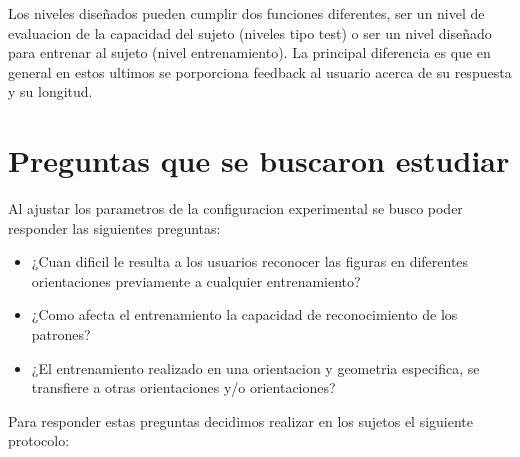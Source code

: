 \documentclass{article}
\begin{document}
Los niveles diseñados pueden cumplir dos funciones diferentes, ser un nivel de evaluacion de la capacidad del sujeto (niveles tipo test) o ser un nivel diseñado para entrenar al sujeto (nivel entrenamiento). La principal diferencia es que en general en estos ultimos se porporciona feedback al usuario acerca de su respuesta y su longitud.

\section{Preguntas que se buscaron estudiar}

Al ajustar los parametros de la configuracion experimental se busco poder responder las siguientes preguntas:

\begin{itemize}
    \item ¿Cuan dificil le resulta a los usuarios reconocer las figuras en diferentes orientaciones previamente a cualquier entrenamiento?
    \item ¿Como afecta el entrenamiento la capacidad de reconocimiento de los patrones?
    \item ¿El entrenamiento realizado en una orientacion y geometria especifica, se transfiere a otras orientaciones y/o orientaciones?
\end{itemize}

Para responder estas preguntas decidimos realizar en los sujetos el siguiente protocolo:
\end{document}

